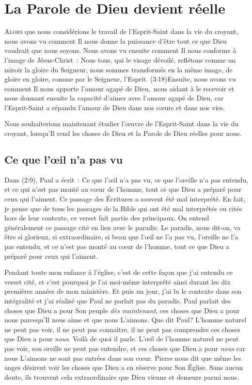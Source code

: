 \chapter{La Parole de Dieu devient r\'eelle}

\lettrine{A}{lors} que nous considérions
 le travail de l'Esprit-Saint
 dans la vie du croyant, nous avons vu comment Il nous donne la puissance
 d'être tout ce que Dieu voudrait que nous soyons.
 Nous avons vu ensuite comment Il nous conforme à l'image de Jésus-Christ~:
 \og Nous tous, qui le visage dévoilé, reflétons comme un miroir la gloire
 du Seigneur, nous sommes transformés en la même image, de gloire en gloire,
 comme par le Seigneur, l'Esprit. \fg{}
 (3:18)Ensuite, nous avons vu comment
 Il nous apporte l'amour agapé de Dieu,~nous aidant à le recevoir
 et nous donnant ensuite la capacité d'aimer
 avec l'amour agapé de Dieu, car l'Esprit-Saint a répandu l'amour de Dieu
 dans nos cœurs et dans nos vies.

Nous souhaiterions maintenant étudier l'œuvre de l'Esprit-Saint dans la vie
 du croyant, lorsqu'Il rend les choses de Dieu et la Parole de Dieu
 réelles pour nous.


\section{Ce que l'\oe{}il n'a pas vu}

Dans (2:9), Paul a écrit~:
 \og Ce que l'œil n'a pas vu, ce que l'oreille n'a pas entendu,
 et ce qui n'est pas monté au cœur de l'homme, tout ce que Dieu
 a préparé pour ceux qui l'aiment. \fg{}
 Ce passage des Écritures a souvent été mal interprété. En fait,
 je pense que de tous les passages de la Bible qui ont été mal interprétés
 ou cités hors de leur contexte, ce verset fait partie des principaux.
 On entend généralement ce passage cité en lien avec le paradis.
 Le paradis, nous dit-on, va être si glorieux, si extraordinaire,
 si beau que \og l'œil ne l'a pas vu, l'oreille ne l'a pas entendu,
 et ce n'est pas monté au cœur de l'homme, tout ce que Dieu a préparé
 pour ceux qui l'aiment. \fg{}

Pendant toute mon enfance à l'église, c'est de cette façon que j'ai entendu
 ce verset cité, et c'est pourquoi je l'ai moi-même interprété ainsi
 durant les dix premières années de mon ministère.
 Et puis un jour, j'ai lu le contexte dans son intégralité et j'ai réalisé
 que Paul ne parlait pas du paradis. Paul parlait des choses que Dieu
 a pour Son peuple \emph{dès maintenant},
 ces choses que Dieu a pour nous parcequ'Il
 nous aime et que nous L'aimons. Que dit Paul?
 L'homme naturel ne peut pas voir, il ne peut pas connaître,
 il ne peut pas comprendre ces choses que Dieu a pour \emph{nous}.
 Voilà de quoi il parle. L'œil de l'homme naturel ne peut pas voir,
 son oreille ne peut pas entendre, et ces choses que Dieu a pour \emph{nous}
 car nous L'aimons ne sont pas entrées dans son cœur.
 Pierre nous dit que même les anges désirent voir les choses que Dieu
 a en réserve pour Son Église.
 Sans aucun doute, ils trouvent cela extraordinaire que Dieu vienne
 et demeure parmi nous.

